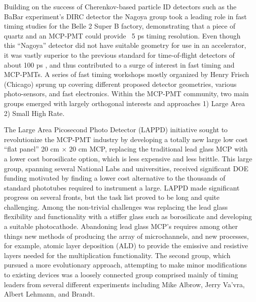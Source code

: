 
Building on the success of Cherenkov-based particle ID detectors such as the BaBar experiment’s DIRC detector\cite{DIRC} the Nagoya group\cite{Nagoya} took a leading role in fast timing studies for the Belle 2 Super B factory, demonstrating that a piece of quartz and an MCP-PMT could provide  ~5 ps timing resolution\cite{Nagdet}. Even though this “Nagoya” detector did not have suitable geometry for use in an accelerator, it was vastly superior to the previous standard for time-of-flight detectors of about 100 ps \cite{TOF}, and thus contributed to a surge of interest in fast timing and MCP-PMTs.  A series of fast timing workshops mostly organized by Henry Frisch (Chicago) sprung up covering different proposed detector geometries, various photo-sensors, and fast electronics. Within the MCP-PMT community, two main groups emerged with largely orthogonal interests and approaches 1) Large Area 2) Small High Rate.  

The Large Area Picosecond Photo Detector (LAPPD)\cite{LAPPD} initiative  sought to revolutionize the MCP-PMT industry by developing a totally new large low cost “flat panel” 20 cm $\times$ 20 cm MCP, replacing the traditional lead glass MCP with a lower cost borosilicate option, which is less expensive and less brittle. This large group, spanning several National Labs and universities, received significant DOE funding motivated by finding a lower cost alternative to the thousands of standard phototubes required to instrument a large. LAPPD made significant progress on several fronts, but the task list proved to be long and quite challenging. Among the non-trivial challenges was replacing the lead glass flexibility and functionality with a stiffer glass such as borosilicate and developing a suitable photocathode. Abandoning lead glass MCP’s requires among other things new methods of producing the array of microchannels, and new processes, for example, atomic layer deposition (ALD)\cite{ALD} to provide the emissive and resistive layers needed for the multiplication functionality. 
The second group, which pursued a more evolutionary approach, attempting to make minor modifications to existing devices was a loosely connected group comprised mainly of timing leaders from several different experiments including Mike Albrow, Jerry Va’vra, Albert Lehmann, and Brandt.


